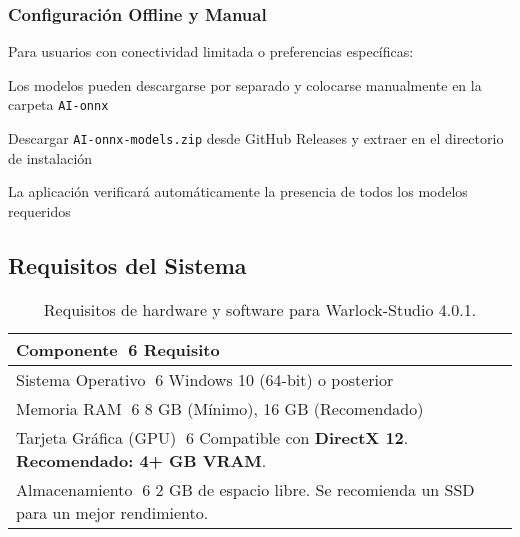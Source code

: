 \documentclass[11pt, a4paper]{article}
\begin{document}
\subsubsection{Configuración Offline y Manual}
Para usuarios con conectividad limitada o preferencias específicas:
\begin{description}[leftmargin=*, style=nextline]
    \item[Instalación Offline:] Los modelos pueden descargarse por separado y colocarse manualmente en la carpeta \texttt{AI-onnx}
    \item[Ubicación Manual:] Descargar \texttt{AI-onnx-models.zip} desde GitHub Releases y extraer en el directorio de instalación
    \item[Verificación de Archivos:] La aplicación verificará automáticamente la presencia de todos los modelos requeridos
\end{description}

\subsection{Requisitos del Sistema}
\begin{table}[H]
    \centering %
    \begin{tabular}{ll}
        \toprule %
        \textbf{Componente} 6 \textbf{Requisito} \\
        \midrule %
        Sistema Operativo 6 Windows 10 (64-bit) o posterior \\
        Memoria RAM 6 8 GB (Mínimo), 16 GB (Recomendado) \\
        Tarjeta Gráfica (GPU) 6 Compatible con \textbf{DirectX 12}. \textbf{Recomendado: 4+ GB VRAM}. \\
        Almacenamiento 6 2 GB de espacio libre. Se recomienda un SSD para un mejor rendimiento. \\
        \bottomrule %
    \end{tabular}
    \caption{Requisitos de hardware y software para Warlock-Studio 4.0.1.}
\end{table}
\end{document}

